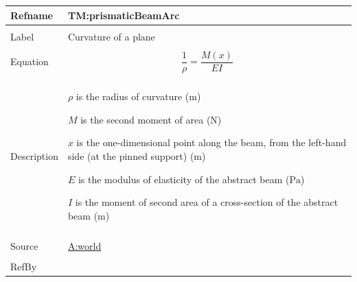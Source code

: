 \documentclass[12pt]{article}
\begin{document}
\begin{minipage}{\textwidth}
\begin{tabular}{>{\raggedright}p{}>{\raggedright\arraybackslash}p{}}
\toprule \textbf{Refname} & \textbf{TM:prismaticBeamArc}
\label{TM:prismaticBeamArc}
\\ \midrule \\
Label & Curvature of a plane
        
\\ \midrule \\
Equation & \begin{displaymath}
           \frac{1}{ρ}=\frac{M\left(x\right)}{E I}
           \end{displaymath}
\\ \midrule \\
Description & \begin{symbDescription}
              \item{$ρ$ is the radius of curvature (${\text{m}}$)}
              \item{$M$ is the second moment of area (${\text{N}}$)}
              \item{$x$ is the one-dimensional point along the beam, from the left-hand side (at the pinned support) (${\text{m}}$)}
              \item{$E$ is the modulus of elasticity of the abstract beam (${\text{Pa}}$)}
              \item{$I$ is the moment of second area of a cross-section of the abstract beam (${\text{m}}$)}
              \end{symbDescription}
\\ \midrule \\
Source & \hyperref[world]{A:world}
         
\\ \midrule \\
RefBy & 
\\ \bottomrule
\end{tabular}
\end{minipage}
\vspace{\baselineskip}
\noindent
\end{document}
